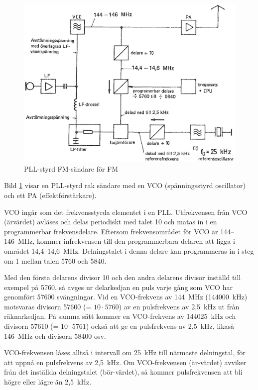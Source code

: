 \begin{figure}
  \includegraphics[width=\textwidth]{images/cropped_pdfs/bild_2_5-07.pdf}
  \caption{PLL-styrd FM-sändare för FM}
  \label{fig:bildII5-7}
\end{figure}

Bild \ref{fig:bildII5-7} visar en PLL-styrd rak sändare med en
VCO (spänningsstyrd oscillator) och ett PA (effektförstärkare).

VCO ingår som det frekvensstyrda elementet i en PLL.
Utfrekvensen från VCO (ärvärdet) avläses och delas periodiskt med talet 10
och matas in i en programmerbar frekvensdelare.
Eftersom frekvensområdet för VCO är 144--146~MHz, kommer infrekvensen till
den programmerbara delaren att ligga i området 14,4--14,6~MHz.
Delningstalet i denna delare kan programmeras in i steg om 1 mellan
talen 5760 och 5840.

Med den första delarens divisor 10 och den andra delarens divisor
inställd till exempel på 5760, så avges ur delarkedjan en puls varje gång som
VCO har genomfört 57600 svängningar.
Vid en VCO-frekvens av 144~MHz (144000~kHz) motsvaras divisorn
57600 (= \(10 \cdot 5760\)) av en pulsfrekvens av 2,5~kHz ut från räknarkedjan.
På samma sätt kommer en VCO-frekvens av 144025~kHz och divisorn
57610 (= \(10 \cdot 5761\)) också att ge en pulsfrekvens av 2,5~kHz,
likaså 146~MHz och divisorn 58400 osv.

VCO-frekvensen låses alltså i intervall om 25~kHz till närmaste
delningstal, för att uppnå en pulsfrekvens av 2,5~kHz.
Om VCO-frekvensen (är-värdet) avviker från det inställda delningstalet
(bör-värdet), så kommer pulsfrekvensen att bli högre eller lägre än
2,5~kHz.

